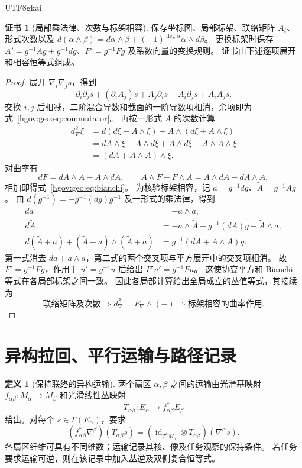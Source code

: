\documentclass[12pt,a4paper,openany,notitlepage]{report}
\theoremstyle{plain}
\theoremstyle{definition}
\newtheorem{definition}[theorem]{定义}
\newtheorem*{certificate}{证书}
\theoremstyle{remark}
\begin{document}
\begin{CJK*}{UTF8}{gkai}
\begin{certificate}[局部乘法律、次数与标架相容]
保存坐标图、局部标架、联络矩阵 $A_i$、形式次数以及
$d(\alpha\wedge\beta)=d\alpha\wedge\beta+(-1)^{\deg\alpha}\alpha\wedge d\beta$。
更换标架时保存
$A'=g^{-1}Ag+g^{-1}dg$、$F'=g^{-1}Fg$ 及系数向量的变换规则。
证书由下述逐项展开和相容恒等式组成。
\end{certificate}

\begin{proof}
展开 $\nabla_i\nabla_js$，得到
\[
\partial_i\partial_js+(\partial_iA_j)s
+A_j\partial_is+A_i\partial_js+A_iA_js.
\]
交换 $i,j$ 后相减，二阶混合导数和截面的一阶导数项相消，余项即为式~\eqref{hgov:geo:eq:commutator}。
再按一形式 $A$ 的次数计算
\[
\begin{aligned}
d_\nabla^2\xi
&=d(d\xi+A\wedge\xi)+A\wedge(d\xi+A\wedge\xi)\\
&=dA\wedge\xi-A\wedge d\xi
+A\wedge d\xi+A\wedge A\wedge\xi\\
&=(dA+A\wedge A)\wedge\xi.
\end{aligned}
\]
对曲率有
\[
dF=dA\wedge A-A\wedge dA,
\qquad
A\wedge F-F\wedge A=A\wedge dA-dA\wedge A,
\]
相加即得式~\eqref{hgov:geo:eq:bianchi}。
为核验标架相容，记 $a=g^{-1}dg$、$\widetilde A=g^{-1}Ag$。
由 $d(g^{-1})=-g^{-1}(dg)g^{-1}$ 及一形式的乘法律，得到
\[
\begin{aligned}
da&=-a\wedge a,\\
d\widetilde A&=-a\wedge\widetilde A+g^{-1}(dA)g-\widetilde A\wedge a,\\
d(\widetilde A+a)+(\widetilde A+a)\wedge(\widetilde A+a)
&=g^{-1}(dA+A\wedge A)g.
\end{aligned}
\]
第一式消去 $da+a\wedge a$，第二式的两个交叉项与平方展开中的交叉项相消。
故 $F'=g^{-1}Fg$，作用于 $u'=g^{-1}u$ 后给出 $F'u'=g^{-1}Fu$。
这使协变平方和 Bianchi 等式在各局部标架之间一致。
因此各局部计算给出全局成立的丛值等式，其接续为
\[
\text{联络矩阵及次数}
\Longrightarrow d_\nabla^2=F_\nabla\wedge(-)
\Longrightarrow\text{标架相容的曲率作用}.
\]
\end{proof}

\section{异构拉回、平行运输与路径记录}
\label{exp:geo:section:pullback}

\begin{definition}[保持联络的异构运输]
\label{hgov:geo:def:heterogeneous}
两个扇区 $\alpha,\beta$ 之间的运输由光滑基映射
$f_{\alpha\beta}:M_\alpha\to M_\beta$ 和光滑线性丛映射
\[
T_{\alpha\beta}:E_\alpha\longrightarrow f_{\alpha\beta}^*E_\beta
\]
给出。对每个 $s\in\Gamma(E_\alpha)$，要求
\begin{equation}
\label{hgov:geo:eq:connection-intertwining}
(f_{\alpha\beta}^*\nabla^\beta)(T_{\alpha\beta}s)
=(\operatorname{id}_{T^*M_\alpha}\otimes T_{\alpha\beta})(\nabla^\alpha s).
\end{equation}
各扇区纤维可具有不同维数；运输记录其核、像及任务观察的保持条件。
若任务要求运输可逆，则在该记录中加入丛逆及双侧复合恒等式。
\end{definition}


\end{CJK*}
\end{document}
